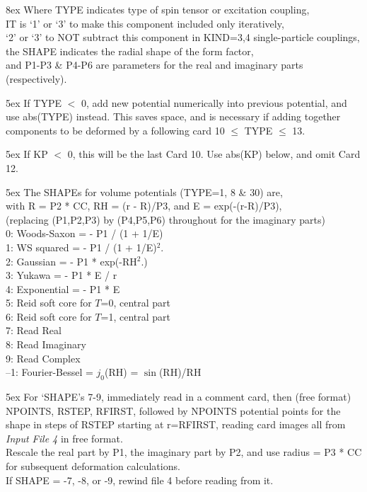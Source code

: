 \documentclass[11pt]{article}
\begin{document}
\hangindent 8ex  Where
      TYPE indicates type of spin tensor or excitation coupling,
\\  IT is `1' or `3' to make this component included only iteratively,\\
 \hspace*{8mm} `2' or `3' to NOT subtract this component in KIND=3,4 single-particle
 couplings,
\\  the SHAPE indicates the radial shape of the form factor,
\\  and P1-P3 \& P4-P6 are parameters for the real and imaginary
parts (respectively).


\medskip

\hangindent 5ex
If TYPE $<$ 0, add new potential numerically into previous potential,
and use abs(TYPE) instead.   This saves space, and is necessary if adding
together components to be deformed by a following card 10 $\leq$ TYPE $\leq$ 13.

\hangindent 5ex
If KP $<$ 0, this will be the last Card 10.  Use abs(KP) below,
and omit Card 12.

\bigskip

\hangindent 5ex
The SHAPEs for volume potentials (TYPE=1, 8 \& 30) are,
\\
with R = P2 * CC, RH = (r - R)/P3, and E = exp(-(r-R)/P3),
\\
(replacing (P1,P2,P3) by (P4,P5,P6) throughout for the imaginary parts)\\
%
   0: Woods-Saxon  = - P1 / (1 + 1/E)
\\ 1: WS squared   = - P1 / (1 + 1/E)$^2$.
\\ 2: Gaussian     = - P1 * exp(-RH$^2$.)
\\ 3: Yukawa       = - P1 * E / r
\\ 4: Exponential  = - P1 * E
\\ 5: Reid soft core for $T$=0, central part
\\ 6: Reid soft core for $T$=1, central part
\\ 7: Read Real
\\ 8: Read Imaginary
\\ 9: Read Complex
\\--1: Fourier-Bessel = $j_0$(RH) = $\sin$(RH)/RH


\hangindent 5ex
For `SHAPE's 7-9, immediately read in a comment card,
then (free format) NPOINTS, RSTEP, RFIRST,
followed by NPOINTS potential points
for the shape in steps of RSTEP starting at r=RFIRST,
reading card images all from {\em Input File 4} in free format.
\\
Rescale the real part by P1, the imaginary part by P2,
and use radius = P3 * CC for subsequent deformation calculations.
\\
If SHAPE = -7, -8, or -9, rewind file 4 before reading from it.
\bigskip
\end{document}
